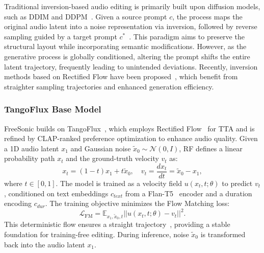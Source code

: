 Traditional inversion-based audio editing is primarily built upon diffusion models, such as DDIM and DDPM~\cite{jia2025audioeditor,xu2024prompt,manor2024zero,liang2025audiomorphix}. Given a source prompt $c$, the process maps the original audio latent into a noise representation via inversion, followed by reverse sampling guided by a target prompt $c^*$~\cite{dai2025latent,wang2025audiomog,dai2026omni2sound}. This paradigm aims to preserve the structural layout while incorporating semantic modifications. However, as the generative process is globally conditioned, altering the prompt shifts the entire latent trajectory, frequently leading to unintended deviations. Recently, inversion methods based on Rectified Flow have been proposed~\cite{wang2024taming,deng2024fireflow,xie2026dnaedit}, which benefit from straighter sampling trajectories and enhanced generation efficiency.

\subsubsection{TangoFlux Base Model}

FreeSonic builds on TangoFlux~\cite{hung2024tangoflux}, which employs Rectified Flow~\cite{liu2022flow} for TTA and is refined by CLAP-ranked preference optimization to enhance audio quality. Given a 1D audio latent $x_1$ and Gaussian noise $\tilde{x}_0 \sim \mathcal{N}(0, I)$, RF defines a linear probability path $x_t$ and the ground-truth velocity $v_t$ as:
\begin{equation}
x_t = (1 - t)x_1 + t\tilde{x}_0, \quad v_t = \frac{dx_t}{dt} = \tilde{x}_0 - x_1,
\end{equation}
where $t\in[0, 1]$. The model is trained as a velocity field $u(x_t, t; \theta)$ to predict $v_t$, conditioned on text embeddings $c_{text}$ from a Flan-T5~\cite{longpre2023flan} encoder and a duration encoding $c_{dur}$. The training objective minimizes the Flow Matching loss:
\begin{equation}
\mathcal{L}_{\text{FM}} = \mathbb{E}_{x_1, \tilde{x}_0, t} || u(x_t, t; \theta) - v_t ||^2 .
\end{equation}
This deterministic flow ensures a straight trajectory~\cite{esser2024scaling}, providing a stable foundation for training-free editing. 
During inference, noise $\tilde{x}_0$ is transformed back into the audio latent $x_1$.

